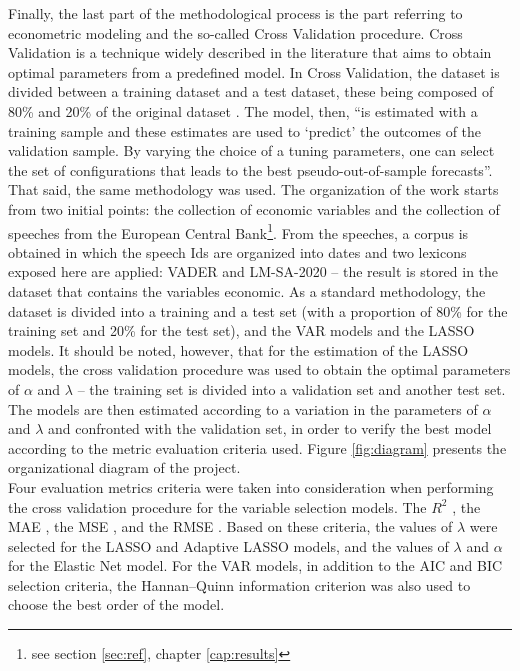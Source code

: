 Finally, the last part of the methodological process is the part referring to econometric modeling and the so-called Cross Validation procedure. Cross Validation is a technique widely described in the literature \cite[]{hoornweg2018science, hastie2009elements, stone1974cross, breiman1992submodel} that aims to obtain optimal parameters from a predefined model. In Cross Validation, the dataset is divided between a training dataset and a test dataset, these being composed of 80\% and 20\% of the original dataset \cite[291]{breiman1992submodel}. The model, then, ``is estimated with a training sample and these estimates are used to ‘predict’ the outcomes of the validation sample. By varying the choice of a tuning parameters, one can select the set of configurations that leads to the best pseudo-out-of-sample forecasts''\cite[p.136]{hoornweg2018science}.\\

That said, the same methodology was used. The organization of the work starts from two initial points: the collection of economic variables and the collection of speeches from the European Central Bank\footnote{see section \ref{sec:ref}, chapter \ref{cap:results}}. From the speeches, a corpus is obtained in which the speech Ids are organized into dates and two lexicons exposed here are applied: VADER and LM-SA-2020 -- the result is stored in the dataset that contains the variables economic. As a standard methodology, the dataset is divided into a training and a test set (with a proportion of 80\% for the training set and 20\% for the test set), and the VAR models and the LASSO models. It should be noted, however, that for the estimation of the LASSO models, the cross validation procedure was used to obtain the optimal parameters of $\alpha$ and $\lambda$ -- the training set is divided into a validation set and another test set. The models are then estimated according to a variation in the parameters of $\alpha$ and $\lambda$ and confronted with the validation set, in order to verify the best model according to the metric evaluation criteria used. Figure \ref{fig:diagram} presents the organizational diagram of the project.\\

Four evaluation metrics criteria were taken into consideration when performing the cross validation procedure for the variable selection models. The $R^2$ \cite{heinisch1962steel}, the MAE \cite{willmott2005advantages}, the MSE \cite{bickel2015mathematical}, and the RMSE \cite{hyndman2006another}. Based on these criteria, the values of $\lambda$ were selected for the LASSO and Adaptive LASSO models, and the values of $\lambda$ and $\alpha$ for the Elastic Net model. For the VAR models, in addition to the AIC and BIC selection criteria, the Hannan–Quinn information criterion \cite{hannan1979determination} was also used to choose the best order of the model.\\



